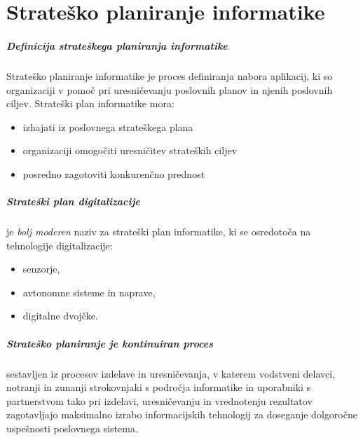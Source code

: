 \documentclass[a4paper,12pt]{report}
\begin{document}
\chapter{Strateško planiranje informatike}
   \paragraph{Definicija strateškega planiranja informatike} Strateško planiranje informatike je proces definiranja nabora aplikacij, ki so organizaciji v pomoč pri uresničevanju poslovnih planov in njenih poslovnih ciljev.
   Strateški plan informatike mora:
      \begin{itemize}
         \item izhajati iz poslovnega strateškega plana
         \item organizaciji omogočiti uresničitev strateških ciljev
         \item posredno zagotoviti konkurenčno prednost
      \end{itemize}

   \paragraph{Strateški plan digitalizacije} je \emph{bolj moderen} naziv za strateški plan informatike, ki se osredotoča na tehnologije digitalizacije:
      \begin{itemize}
         \item senzorje,
         \item avtonomne sisteme in naprave,
         \item digitalne dvojčke.
      \end{itemize}

   \paragraph{Strateško planiranje je kontinuiran proces} sestavljen iz procesov izdelave in uresničevanja, v katerem vodstveni delavci, notranji in zunanji strokovnjaki s področja informatike in uporabniki s partnerstvom tako pri izdelavi, uresničevanju in vrednotenju rezultatov zagotavljajo maksimalno izrabo informacijskih tehnologij za doseganje dolgoročne uspešnosti poslovnega sistema.
\end{document}
